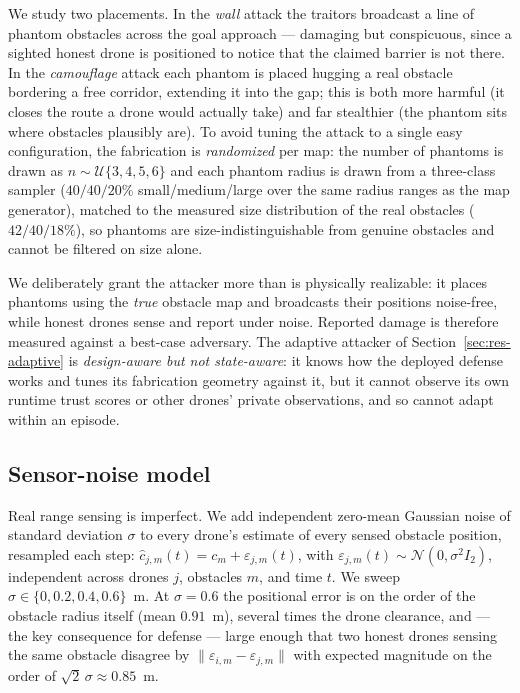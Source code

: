 We study two placements. In the \emph{wall} attack the traitors broadcast a
line of phantom obstacles across the goal approach --- damaging but
conspicuous, since a sighted honest drone is positioned to notice that the
claimed barrier is not there. In the \emph{camouflage} attack each phantom
is placed hugging a real obstacle bordering a free corridor, extending it
into the gap; this is both more harmful (it closes the route a drone would
actually take) and far stealthier (the phantom sits where obstacles
plausibly are). To avoid tuning the attack to a single easy configuration,
the fabrication is \emph{randomized} per map: the number of phantoms is
drawn as $n\sim\mathcal{U}\{3,4,5,6\}$ and each phantom radius is drawn
from a three-class sampler ($40/40/20\%$ small/medium/large over the same
radius ranges as the map generator), matched to the measured size
distribution of the real obstacles ($42/40/18\%$), so phantoms are
size-indistinguishable from genuine obstacles and cannot be filtered on
size alone.

We deliberately grant the attacker more than is physically realizable: it
places phantoms using the \emph{true} obstacle map and broadcasts their
positions noise-free, while honest drones sense and report under noise.
Reported damage is therefore measured against a best-case adversary. The
adaptive attacker of Section~\ref{sec:res-adaptive} is
\emph{design-aware but not state-aware}: it knows how the deployed defense
works and tunes its fabrication geometry against it, but it cannot observe
its own runtime trust scores or other drones' private observations, and so
cannot adapt within an episode.

\subsection{Sensor-noise model}\label{sec:methods-noise}
Real range sensing is imperfect. We add independent zero-mean Gaussian noise
of standard deviation $\sigma$ to every drone's estimate of every sensed
obstacle position, resampled each step:
$\hat{c}_{j,m}(t) = c_m + \varepsilon_{j,m}(t)$, with
$\varepsilon_{j,m}(t)\sim\mathcal{N}(0,\sigma^2 I_2)$, independent across
drones $j$, obstacles $m$, and time $t$. We sweep
$\sigma\in\{0,0.2,0.4,0.6\}$~m. At $\sigma=0.6$ the positional error is on
the order of the obstacle radius itself (mean $0.91$~m), several times the
drone clearance, and --- the key consequence for defense --- large enough
that two honest drones sensing the same obstacle disagree by
$\lVert\varepsilon_{i,m}-\varepsilon_{j,m}\rVert$ with expected magnitude on
the order of $\sqrt{2}\,\sigma\approx0.85$~m.

